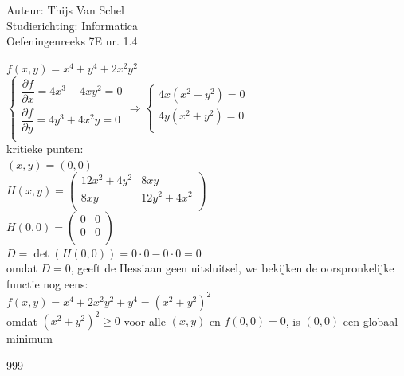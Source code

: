 \documentclass[a4paper]{article}
\begin{document}
  
\noindent \large Auteur: Thijs Van Schel \\
\noindent \large Studierichting: Informatica\\
\noindent \large Oefeningenreeks 7E nr. 1.4\\

\medskip

\normalsize

$f(x,y) = x^4 + y^4 + 2x^2y^2$\\

$\left\{
    \begin{array}{l}
        \dfrac{\partial f}{\partial x} = 4x^3 + 4xy^2 = 0\\
        \dfrac{\partial f}{\partial y} = 4y^3 + 4x^2y = 0\\
    \end{array}
\right. \Rightarrow \left\{
    \begin{array}{l}
        4x(x^2 + y^2) = 0\\
        4y(x^2 + y^2) = 0\\
    \end{array}
\right.$\\

kritieke punten:\\

$(x,y) = (0,0)$\\

$H(x,y) = \left(
    \begin{array}{cc}
        12x^2 + 4y^2 & 8xy \\
        8xy & 12y^2 + 4x^2 \\
    \end{array}
\right)$\\

$H(0,0) = \left(
    \begin{array}{cc}
        0 & 0 \\
        0 & 0 \\
    \end{array}
\right)$\\

$D = \det(H(0,0)) = 0 \cdot 0 - 0 \cdot 0 = 0$\\

omdat $D = 0$, geeft de Hessiaan geen uitsluitsel, we bekijken de oorspronkelijke functie nog eens:\\

$f(x,y) = x^4 + 2x^2y^2 + y^4 = (x^2 + y^2)^2$\\

omdat $(x^2 + y^2)^2 \ge 0$ voor alle $(x,y)$ en $f(0,0) = 0$, is $(0,0)$ een globaal minimum\\

\begin{thebibliography}{999}
\end{thebibliography}
\end{document}
